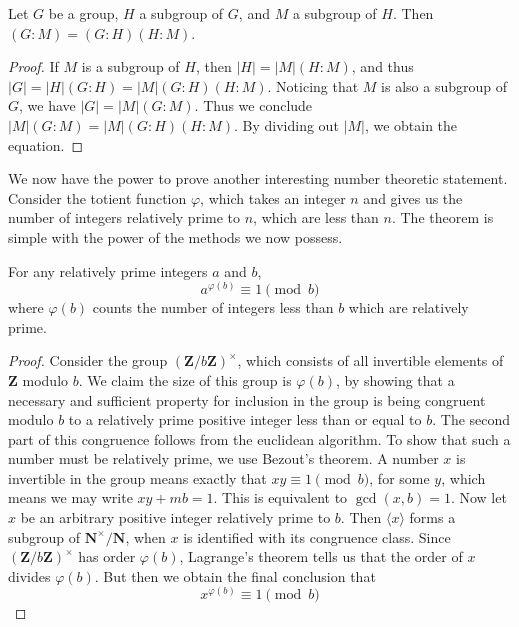 \begin{corollary} 
    Let $G$ be a group, $H$ a subgroup of $G$, and $M$ a subgroup of $H$. Then $(G:M) = (G:H)(H:M)$.
\end{corollary}
\begin{proof}
    If $M$ is a subgroup of $H$, then $|H| = |M|(H:M)$, and thus $|G| = |H|(G:H) = |M|(G:H)(H:M)$. Noticing that $M$ is also a subgroup of $G$, we have $|G| = |M|(G:M)$. Thus we conclude $|M|(G:M) = |M|(G:H)(H:M)$. By dividing out $|M|$, we obtain the equation.
\end{proof}

We now have the power to prove another interesting number theoretic statement. Consider the totient function $\varphi$, which takes an integer $n$ and gives us the number of integers relatively prime to $n$, which are less than $n$. The theorem is simple with the power of the methods we now possess.

\begin{corollary}
    For any relatively prime integers $a$ and $b$,
    \[ a^{\varphi(b)} \equiv 1 \pmod{b} \]
    where $\varphi(b)$ counts the number of integers less than $b$ which are relatively prime.
\end{corollary}
\begin{proof}
    Consider the group $\left(\mathbf{Z}/b\mathbf{Z}\right)^\times$, which consists of all invertible elements of $\mathbf{Z}$ modulo $b$. We claim the size of this group is $\varphi(b)$, by showing that a necessary and sufficient property for inclusion in the group is being congruent modulo $b$ to a relatively prime positive integer less than or equal to $b$. The second part of this congruence follows from the euclidean algorithm. To show that such a number must be relatively prime, we use Bezout's theorem. A number $x$ is invertible in the group means exactly that $xy \equiv 1 \pmod{b}$, for some $y$, which means we may write $xy + mb = 1$. This is equivalent to $\gcd(x,b) = 1$. Now let $x$ be an arbitrary positive integer relatively prime to $b$. Then $\langle x \rangle$ forms a subgroup of $\mathbf{N}^\times/\mathbf{N}$, when $x$ is identified with its congruence class. Since $\left(\mathbf{Z}/b\mathbf{Z}\right)^\times$  has order $\varphi(b)$, Lagrange's theorem tells us that the order of $x$ divides $\varphi(b)$. But then we obtain the final conclusion that
    \[ x^{\varphi(b)} \equiv 1 \pmod{b} \]
\end{proof}

